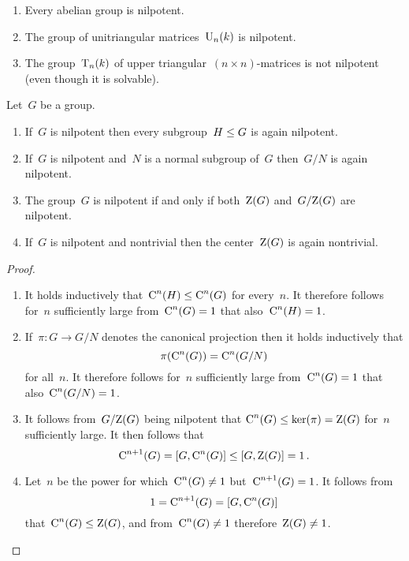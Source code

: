 \begin{example}
  \leavevmode
  \begin{enumerate}
    \item
      Every abelian group is nilpotent.
    \item
      The group of unitriangular matrices~$\operatorname{U}_n(k)$ is nilpotent.
    \item
      The group~$\operatorname{T}_n(k)$ of upper triangular~$(n \times n)$\nobreakdash-matrices is not nilpotent (even though it is solvable).
  \end{enumerate}
\end{example}




\begin{lemma}
  Let~$G$ be a group.
  \begin{enumerate}
    \item
      If~$G$ is nilpotent then every subgroup~$H \leq G$ is again nilpotent.
    \item
      If~$G$ is nilpotent and~$N$ is a normal subgroup of~$G$ then~$G/N$ is again nilpotent.
    \item
      The group~$G$ is nilpotent if and only if both~$\operatorname{Z}(G)$ and~$G/{\operatorname{Z}(G)}$ are nilpotent.
    \item
      If~$G$ is nilpotent and nontrivial then the center~$\operatorname{Z}(G)$ is again nontrivial.
  \end{enumerate}
\end{lemma}


\begin{proof}
  \leavevmode
  \begin{enumerate}
    \item
      It holds inductively that~$\operatorname{C}^n(H) \leq \operatorname{C}^n(G)$ for every~$n$.
      It therefore follows for~$n$ sufficiently large from~$\operatorname{C}^n(G) = 1$ that also~$\operatorname{C}^n(H) = 1$.
    \item
      If~$\pi \colon G \to G/N$ denotes the canonical projection then it holds inductively that
      \[
          \pi(\operatorname{C}^n(G))
        = \operatorname{C}^n(G/N)
      \]
      for all~$n$.
      It therefore follows for~$n$ sufficiently large from~$\operatorname{C}^n(G) = 1$ that also~$\operatorname{C}^n(G/N) = 1$.
    \item
      It follows from~$G/{\operatorname{Z}(G)}$ being nilpotent that $\operatorname{C}^n(G) \leq \ker(\pi) = \operatorname{Z}(G)$ for~$n$ sufficiently large.
      It then follows that
      \[
                  \operatorname{C}^{n+1}(G)
        =         [G, \operatorname{C}^n(G)]
        \leq [G, \operatorname{Z}(G)]
        =         1 \,.
      \]
    \item
      Let~$n$ be the power for which~$\operatorname{C}^n(G) \neq 1$ but~$\operatorname{C}^{n+1}(G) = 1$.
      It follows from
      \[
          1
        = \operatorname{C}^{n+1}(G)
        = [G, \operatorname{C}^n(G)]
      \]
      that~$\operatorname{C}^n(G) \leq \operatorname{Z}(G)$, and from~$\operatorname{C}^n(G) \neq 1$ therefore~$\operatorname{Z}(G) \neq 1$.
    \qedhere
  \end{enumerate}
\end{proof}



